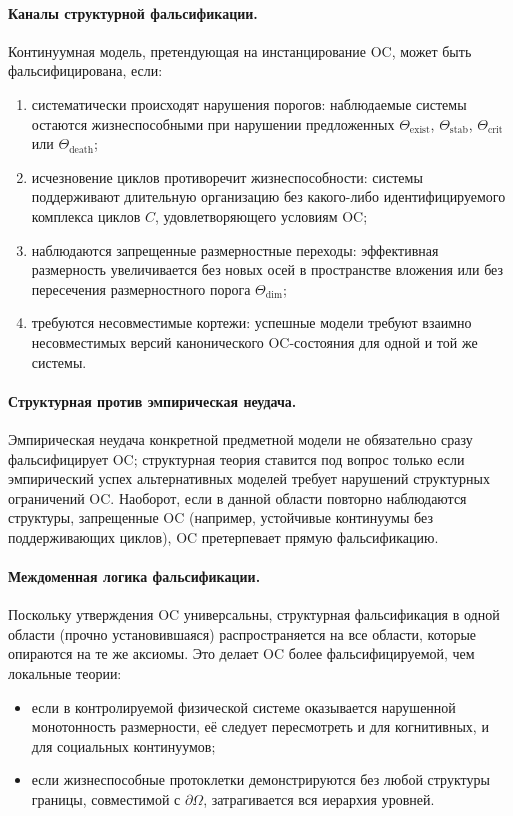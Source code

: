 \paragraph{Каналы структурной фальсификации.}
Континуумная модель, претендующая на инстанцирование OC, может быть
фальсифицирована, если:
\begin{enumerate}
  \item
        систематически происходят нарушения порогов: наблюдаемые системы
        остаются жизнеспособными при нарушении предложенных
        \(\Theta_{\mathrm{exist}}\), \(\Theta_{\mathrm{stab}}\),
        \(\Theta_{\mathrm{crit}}\) или \(\Theta_{\mathrm{death}}\);
  \item
        исчезновение циклов противоречит жизнеспособности: системы
        поддерживают длительную организацию без какого-либо идентифицируемого
        комплекса циклов \(C\), удовлетворяющего условиям OC;
  \item
        наблюдаются запрещенные размерностные переходы: эффективная размерность
        увеличивается без новых осей в пространстве вложения или без пересечения
        размерностного порога \(\Theta_{\mathrm{dim}}\);
  \item
        требуются несовместимые кортежи: успешные модели требуют взаимно
        несовместимых версий канонического OC-состояния для одной и той же
        системы.
\end{enumerate}

\paragraph{Структурная против эмпирическая неудача.}
Эмпирическая неудача конкретной предметной модели не обязательно сразу
фальсифицирует OC; структурная теория ставится под вопрос только если
эмпирический успех альтернативных моделей требует нарушений структурных
ограничений OC. Наоборот, если в данной области повторно наблюдаются
структуры, запрещенные OC (например, устойчивые континуумы без поддерживающих
циклов), OC претерпевает прямую фальсификацию.

\paragraph{Междоменная логика фальсификации.}
Поскольку утверждения OC универсальны, структурная фальсификация в одной
области (прочно установившаяся) распространяется на все области, которые
опираются на те же аксиомы. Это делает OC более фальсифицируемой, чем
локальные теории:
\begin{itemize}
  \item если в контролируемой физической системе оказывается нарушенной
        монотонность размерности, её следует пересмотреть и для когнитивных,
        и для социальных континуумов;
  \item если жизнеспособные протоклетки демонстрируются без любой
        структуры границы, совместимой с \(\partial\Omega\), затрагивается
        вся иерархия уровней.
\end{itemize}

